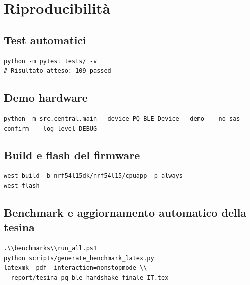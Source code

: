 \documentclass[11pt,a4paper]{article}
\begin{document}
\section{Riproducibilità}

\subsection{Test automatici}
\begin{lstlisting}[style=bashstyle]
python -m pytest tests/ -v
# Risultato atteso: 109 passed
\end{lstlisting}

\subsection{Demo hardware}
\begin{lstlisting}[style=bashstyle]
python -m src.central.main --device PQ-BLE-Device --demo  --no-sas-confirm  --log-level DEBUG
\end{lstlisting}

\subsection{Build e flash del firmware}
\begin{lstlisting}[style=bashstyle]
west build -b nrf54l15dk/nrf54l15/cpuapp -p always
west flash
\end{lstlisting}

\subsection{Benchmark e aggiornamento automatico della tesina}
\begin{lstlisting}[style=bashstyle]
.\\benchmarks\\run_all.ps1
python scripts/generate_benchmark_latex.py
latexmk -pdf -interaction=nonstopmode \\
  report/tesina_pq_ble_handshake_finale_IT.tex
\end{lstlisting}



\end{document}
